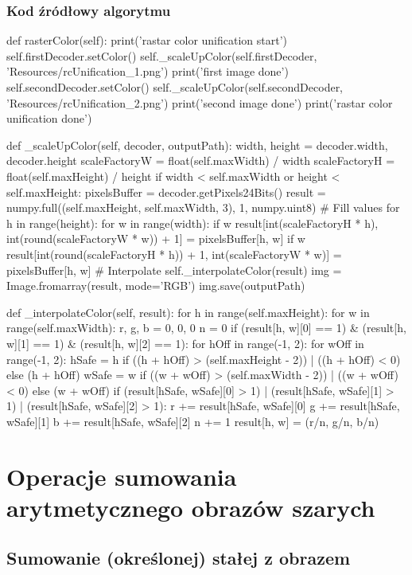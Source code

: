 \documentclass[a4paper,12pt]{book}
\begin{document}
\subsection*{Kod źródłowy algorytmu}
\begin{python}
def rasterColor(self):
	print('rastar color unification start')
	self.firstDecoder.setColor()
	self._scaleUpColor(self.firstDecoder, 'Resources/rcUnification_1.png')
	print('first image done')
	self.secondDecoder.setColor()
	self._scaleUpColor(self.secondDecoder, 'Resources/rcUnification_2.png')
	print('second image done')
	print('rastar color unification done')

def _scaleUpColor(self, decoder, outputPath):
	width, height = decoder.width, decoder.height
	scaleFactoryW = float(self.maxWidth) / width
	scaleFactoryH = float(self.maxHeight) / height
	if width < self.maxWidth or height < self.maxHeight:
		pixelsBuffer = decoder.getPixels24Bits()
		result = numpy.full((self.maxHeight, self.maxWidth, 3), 1, numpy.uint8)
		# Fill values
		for h in range(height):
			for w in range(width):
				if w%
					result[int(scaleFactoryH * h), int(round(scaleFactoryW * w)) + 1] = pixelsBuffer[h, w]
				if w%
					result[int(round(scaleFactoryH * h)) + 1, int(scaleFactoryW * w)] = pixelsBuffer[h, w]
			# Interpolate
			self._interpolateColor(result)
			img = Image.fromarray(result, mode='RGB')
			img.save(outputPath)

def _interpolateColor(self, result):
	for h in range(self.maxHeight):
		for w in range(self.maxWidth):
			r, g, b = 0, 0, 0
			n = 0
			if (result[h, w][0] == 1) & (result[h, w][1] == 1) & (result[h, w][2] == 1):
				for hOff in range(-1, 2):
					for wOff in range(-1, 2):
						hSafe = h if ((h + hOff) > (self.maxHeight - 2)) | ((h + hOff) < 0) else (h + hOff)
						wSafe = w if ((w + wOff) > (self.maxWidth - 2)) | ((w + wOff) < 0) else (w + wOff)
						if (result[hSafe, wSafe][0] > 1) | (result[hSafe, wSafe][1] > 1) | (result[hSafe, wSafe][2] > 1):
							r += result[hSafe, wSafe][0]
							g += result[hSafe, wSafe][1]
							b += result[hSafe, wSafe][2]
							n += 1
				result[h, w] = (r/n, g/n, b/n)
\end{python}

\chapter{Operacje sumowania arytmetycznego obrazów szarych}
\section{Sumowanie (określonej) stałej z obrazem}
\end{document}
